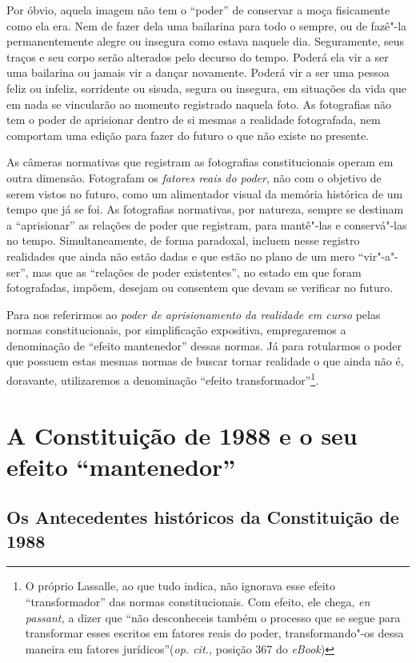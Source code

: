 Por óbvio, aquela imagem não tem o ``poder'' de conservar a moça
fisicamente como ela era. Nem de fazer dela uma bailarina para todo o
sempre, ou de fazê"-la permanentemente alegre ou insegura como estava
naquele dia. Seguramente, seus traços e seu corpo serão alterados pelo
decurso do tempo. Poderá ela vir a ser uma bailarina ou jamais vir a
dançar novamente. Poderá vir a ser uma pessoa feliz ou infeliz,
sorridente ou sisuda, segura ou insegura, em situações da vida que em
nada se vincularão ao momento registrado naquela foto. As fotografias
não tem o poder de aprisionar dentro de si mesmas a realidade
fotografada, nem comportam uma edição para fazer do futuro o que não
existe no presente.

As câmeras normativas que registram as fotografias constitucionais
operam em outra dimensão. Fotografam os \emph{fatores reais do poder},
não com o objetivo de serem vistos no futuro, como um alimentador visual
da memória histórica de um tempo que já se foi. As fotografias
normativas, por natureza, sempre se destinam a ``aprisionar'' as
relações de poder que registram, para mantê"-las e conservá"-las no tempo.
Simultaneamente, de forma paradoxal, incluem nesse registro realidades
que ainda não estão dadas e que estão no plano de um mero
``vir"-a"-ser'', mas que as ``relações de poder
existentes'', no estado em que foram fotografadas, impõem,
desejam ou consentem que devam se verificar no futuro.

Para nos referirmos ao \emph{poder de aprisionamento da realidade em
curso} pelas normas constitucionais, por simplificação expositiva,
empregaremos a denominação de ``efeito mantenedor'' dessas
normas. Já para rotularmos o poder que possuem estas mesmas normas de
buscar tornar realidade o que ainda não é, doravante, utilizaremos a
denominação ``efeito transformador''\footnote{O próprio Lassalle,
  ao que tudo indica, não ignorava esse efeito ``transformador'' das
  normas constitucionais. Com efeito, ele chega, \emph{en passant,} a
  dizer que ``não desconheceis também o processo que se segue para
  transformar esses escritos em fatores reais do poder, transformando"-os
  dessa maneira em fatores jurídicos''(\emph{op. cit.,} posição 367 do
  \emph{eBook})}.

\section{A Constituição de 1988 e o seu efeito
``mantenedor''}

\subsection{Os Antecedentes históricos da Constituição de 1988}

